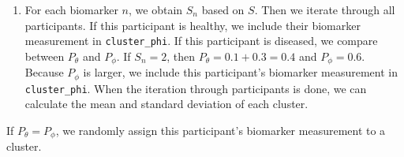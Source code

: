 \documentclass[
  letterpaper,
  DIV=11,
  numbers=noendperiod]{scrreprt}
\providecommand{\tightlist}{%
  \setlength{\itemsep}{0pt}\setlength{\parskip}{0pt}}\usepackage{longtable,booktabs,array}
\begin{document}
\begin{enumerate}
\def\labelenumi{\arabic{enumi}.}
\setcounter{enumi}{1}
\tightlist
\item
  For each biomarker \(n\), we obtain \(S_n\) based on \(S\). Then we
  iterate through all participants. If this participant is healthy, we
  include their biomarker measurement in \texttt{cluster\_phi}. If this
  participant is diseased, we compare between \(P_{\theta}\) and
  \(P_{\phi}\). If \(S_n = 2\), then \(P_{\theta} = 0.1 + 0.3 = 0.4\)
  and \(P_{\phi} = 0.6\). Because \(P_{\phi}\) is larger, we include
  this participant's biomarker measurement in \texttt{cluster\_phi}.
  When the iteration through participants is done, we can calculate the
  mean and standard deviation of each cluster.
\end{enumerate}

\begin{tcolorbox}[enhanced jigsaw, breakable, bottomtitle=1mm, toprule=.15mm, colframe=quarto-callout-tip-color-frame, colbacktitle=quarto-callout-tip-color!10!white, arc=.35mm, bottomrule=.15mm, left=2mm, opacitybacktitle=0.6, toptitle=1mm, colback=white, opacityback=0, title=\textcolor{quarto-callout-tip-color}{\faLightbulb}\hspace{0.5em}{Tip}, titlerule=0mm, rightrule=.15mm, leftrule=.75mm, coltitle=black]

If \(P_{\theta} =  P_{\phi}\), we randomly assign this participant's
biomarker measurement to a cluster.

\end{tcolorbox}
\end{document}
